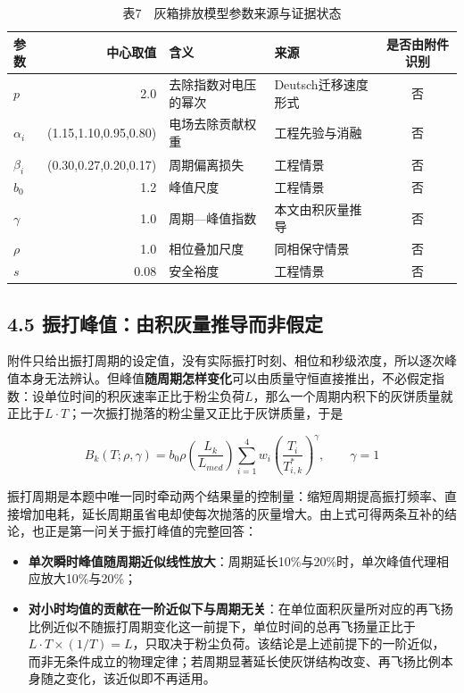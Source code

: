 \documentclass[UTF8,zihao=5,a4paper]{ctexart}
\begin{document}
\begin{table}[htb]
\centering
\caption*{\normalsize 表7　灰箱排放模型参数来源与证据状态}
\vspace{-2pt}
\begin{tabularx}{\textwidth}{lr>{\hsize=1.013\hsize\raggedright\arraybackslash}X>{\hsize=0.987\hsize\raggedright\arraybackslash}Xc}
\toprule
参数 & 中心取值 & 含义 & 来源 & 是否由附件识别 \\
\midrule
$p$ & 2.0 & 去除指数对电压的幂次 & Deutsch迁移速度形式 & 否 \\
$\alpha_i$ & (1.15,1.10,0.95,0.80) & 电场去除贡献权重 & 工程先验与消融 & 否 \\
$\beta_i$ & (0.30,0.27,0.20,0.17) & 周期偏离损失 & 工程情景 & 否 \\
$b_0$ & 1.2 & 峰值尺度 & 工程情景 & 否 \\
$\gamma$ & 1.0 & 周期—峰值指数 & 本文由积灰量推导 & 否 \\
$\rho$ & 1.0 & 相位叠加尺度 & 同相保守情景 & 否 \\
$s$ & 0.08 & 安全裕度 & 工程情景 & 否 \\
\bottomrule
\end{tabularx}
\end{table}

\subsection*{4.5 振打峰值：由积灰量推导而非假定}

附件只给出振打周期的设定值，没有实际振打时刻、相位和秒级浓度，所以逐次峰值本身无法辨认。但峰值\textbf{随周期怎样变化}可以由质量守恒直接推出，不必假定指数：设单位时间的积灰速率正比于粉尘负荷$L$，那么一个周期内积下的灰饼质量就正比于$L\cdot T$；一次振打抛落的粉尘量又正比于灰饼质量，于是

\begin{equation}
B_k(T;\rho,\gamma)=b_0\rho\left(\frac{L_k}{L_{med}}\right)
\sum_{i=1}^{4}w_i\left(\frac{T_i}{T_{i,k}^*}\right)^{\gamma},\qquad \gamma=1 
\end{equation}

振打周期是本题中唯一同时牵动两个结果量的控制量：缩短周期提高振打频率、直接增加电耗，延长周期虽省电却使每次抛落的灰量增大。由上式可得两条互补的结论，也正是第一问关于振打峰值的完整回答：

\begin{itemize}[itemsep=1pt,topsep=3pt]
\item \textbf{单次瞬时峰值随周期近似线性放大}：周期延长10\%与20\%时，单次峰值代理相应放大10\%与20\%；
\item \textbf{对小时均值的贡献在一阶近似下与周期无关}：在单位面积灰量所对应的再飞扬比例近似不随振打周期变化这一前提下，单位时间的总再飞扬量正比于$L\cdot T\times(1/T)=L$，只取决于粉尘负荷。该结论是上述前提下的一阶近似，而非无条件成立的物理定律；若周期显著延长使灰饼结构改变、再飞扬比例本身随之变化，该近似即不再适用。
\end{itemize}
\end{document}
